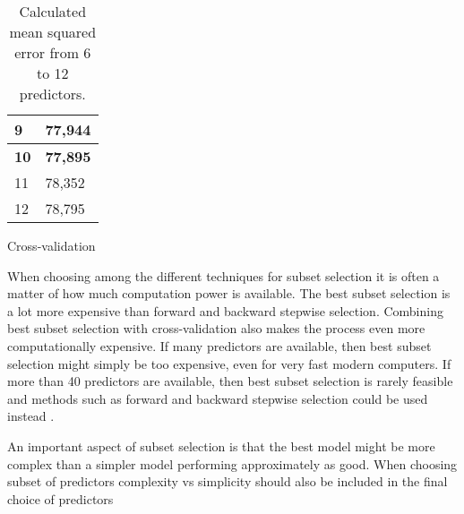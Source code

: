 \begin{table}
\begin{subtable}[t]{2in}
\begin{tabular}{ p{2.5cm} p{1.5cm}  }
		9 & \vspace{0.03em} 77,944  \\\hline
		\vspace{0.03em}
		\textbf{10} & \vspace{0.03em} \textbf{77,895} \\\hline
		\vspace{0.03em}
		11 & \vspace{0.03em} 78,352  \\\hline
		\vspace{0.03em}
		12 & \vspace{0.03em} 78,795 \\\hline
	\end{tabular}
		\caption{Cross-validation}\label{table:mse_cross}
	\end{subtable}
	\caption{Calculated mean squared error from 6 to 12 predictors.}\label{table:mse}
\end{table}

When choosing among the different techniques for subset selection it is often a matter of how much computation power is available.  The best subset selection is a lot more expensive than forward and backward stepwise selection. Combining best subset selection with cross-validation also makes the process even more computationally expensive. If many predictors are available, then best subset selection might simply be too expensive, even for very fast modern computers. If more than 40 predictors are available, then best subset selection is rarely feasible and methods such as forward and backward stepwise selection could be used instead  \citep[pp. 207]{ISLR}. 

An important aspect of subset selection is that the best model might be more complex than a simpler model performing approximately as good. When choosing subset of predictors complexity vs simplicity should also be included in the final choice of predictors